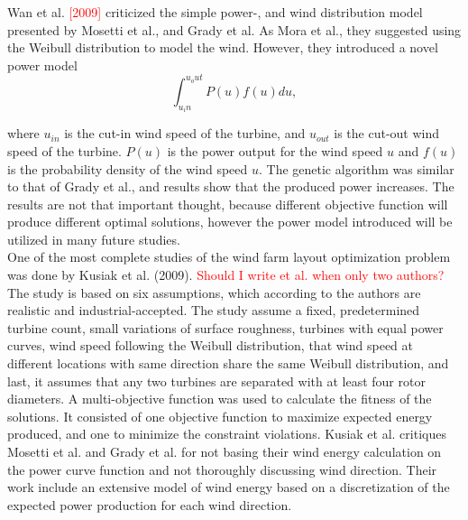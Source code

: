 \noindent Wan et al. \textcolor{red}{[2009]} criticized the simple power-, and wind distribution model presented by Mosetti et al., and Grady et al. As Mora et al., they suggested using the Weibull distribution to model the wind. However, they introduced a novel power model \\


\begin{equation}
\label{Power Model (Wan)}
\int_{u_in}^{u_out} P(u)f(u) du,
\end{equation}


\noindent where $u_{in}$ is the cut-in wind speed of the turbine, and $u_{out}$ is the cut-out wind speed of the turbine. $P(u)$ is the power output for the wind speed $u$ and $f(u)$ is the probability density of the wind speed $u$. The genetic algorithm was similar to that of Grady et al., and results show that the produced power increases. The results are not that important thought, because different objective function will produce different optimal solutions, however the power model introduced will be utilized in many future studies.\\


\noindent One of the most complete studies of the wind farm layout optimization problem was done by Kusiak et al. (2009). \textcolor{red}{Should I write et al. when only two authors?} The study is based on six assumptions, which according to the authors are realistic and industrial-accepted. The study assume a fixed, predetermined turbine count, small variations of surface roughness, turbines with equal power curves, wind speed following the Weibull distribution, that wind speed at different locations with same direction share the same Weibull distribution, and last, it assumes that any two turbines are separated with at least four rotor diameters. A multi-objective function was used to calculate the fitness of the solutions. It consisted of one objective function to maximize expected energy produced, and one to minimize the constraint violations. Kusiak et al. critiques Mosetti et al. and Grady et al. for not basing their wind energy calculation on the power curve function and not thoroughly discussing wind direction. Their work include an extensive model of wind energy based on a discretization of the expected power production for each wind direction. \\




